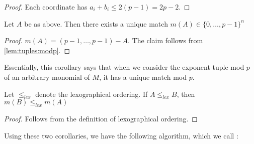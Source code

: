 \begin{proof}
	Each coordinate has \(a_{i} + b_{i} \leq 2(p-1) = 2p-2\).
\end{proof}

\begin{cor}
    \label{cor:unique:match}
	Let $A$ be as above.
	Then there exists a unique
	match \(m(A) \in \{0, \ldots, p-1\}^{n}\) 
\end{cor}

\begin{proof}
	\(m(A) = 
	(p-1, \ldots, p-1) - A\).
	The claim follows from 
	\ref{lem:tuples:modp}.
\end{proof}

Essentially, this corollary says that
when we consider the exponent tuple mod $p$ of 
an arbitrary monomial of \(M\),
it has a unique
match mod \(p\).

\begin{cor}
	\label{cor:match:order}
	Let \(\leq_{lex}\) denote the 
	lexographical ordering.
	If \(A \leq_{lex} B\),
	then 
	\(m(B) \leq_{lex} m(A)\)
\end{cor}

\begin{proof}
	Follows from the definition of lexographical
	ordering.
\end{proof}

Using these two corollaries, we have the following algorithm,
which we call \merge:

